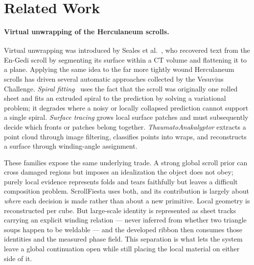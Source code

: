 \section{Related Work}
\label{sec:related}

\paragraph{Virtual unwrapping of the Herculaneum scrolls.} Virtual unwrapping was introduced by Seales et al.~, who recovered text from the En-Gedi scroll by segmenting its surface within a CT volume and flattening it to a plane. Applying the same idea to the far more tightly wound Herculaneum scrolls has driven several automatic approaches collected by the Vesuvius Challenge. \emph{Spiral fitting}~\cite{henderson2026virtually} uses the fact that the scroll was originally one rolled sheet and fits an extruded spiral to the prediction by solving a variational problem; it degrades where a noisy or locally collapsed prediction cannot support a single spiral. \emph{Surface tracing} grows local surface patches and must subsequently decide which fronts or patches belong together. \emph{ThaumatoAnakalyptor} extracts a point cloud through image filtering, classifies points into wraps, and reconstructs a surface through winding-angle assignment.

These families expose the same underlying trade. A strong global scroll prior can cross damaged regions but imposes an idealization the object does not obey; purely local evidence represents folds and tears faithfully but leaves a difficult composition problem. ScrollFiesta uses both, and its contribution is largely about \emph{where} each decision is made rather than about a new primitive. Local geometry is reconstructed per cube. But large-scale identity is represented as sheet tracks carrying an explicit winding relation --- never inferred from whether two triangle soups happen to be weldable --- and the developed ribbon then consumes those identities and the measured phase field. This separation is what lets the system leave a global continuation open while still placing the local material on either side of it.

